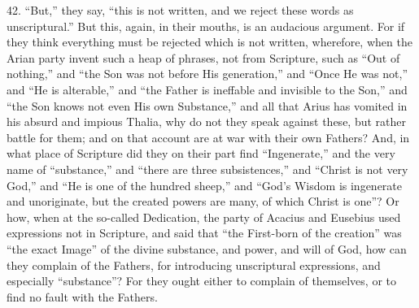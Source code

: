 42. ``But,'' they say, ``this is
not written, and we reject these words as unscriptural.'' But this,
again, in their mouths, is an audacious argument. For if they think
everything must be rejected which is not written, wherefore, when the
Arian party invent such a heap of phrases, not from Scripture, such as
``Out of nothing,'' and ``the Son was not before His generation,'' and ``Once
He was not,'' and ``He is alterable,'' and ``the Father is ineffable and
invisible to the Son,'' and ``the Son knows not even His own Substance,''
and all that Arius has vomited in his absurd and impious Thalia, why
do not they speak against these, but rather battle for them; and on
that account are at war with their own Fathers? And, in what place of
Scripture did they on their part find ``Ingenerate,'' and the very name
of ``substance,'' and ``there are three subsistences,'' and ``Christ is not
very God,'' and ``He is one of the hundred sheep,'' and ``God's Wisdom is
ingenerate and unoriginate, but the created powers are many, of which
Christ is one''? Or how, when at the so-called Dedication, the party of
Acacius and Eusebius used expressions not in Scripture, and said that ``the
First-born of the creation'' was ``the exact Image'' of the divine
substance, and power, and will of God, how can they complain of the
Fathers, for introducing unscriptural expressions, and especially ``substance''?
For they ought either to complain of themselves, or to find no fault
with the Fathers.

